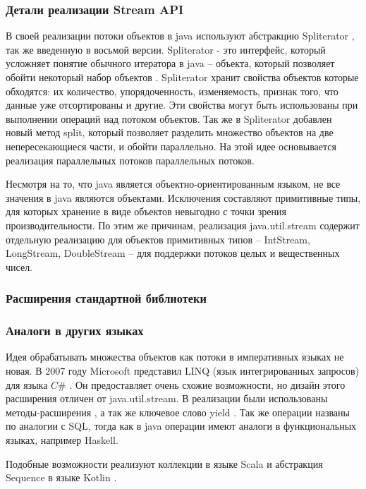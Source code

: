 \subsubsection{Детали реализации Stream API}
В своей реализации потоки объектов в java используют абстракцию Spliterator 
\cite{java:spliterator}, так же введенную в восьмой версии. Spliterator - это интерфейс, 
который усложняет понятие обычного итератора в java -- объекта, который позволяет обойти 
некоторый набор объектов \cite{java:iterator}. Spliterator хранит свойства объектов которые 
обходятся: их количество, упорядоченность, изменяемость, признак того, что данные уже 
отсортированы и другие. Эти свойства могут быть использованы при выполнении операций над 
потоком объектов. Так же в Spliterator добавлен новый метод split, который позволяет 
разделить множество объектов на две непересекающиеся части, и обойти параллельно. На этой идее основывается реализация параллельных потоков параллельных потоков.

Несмотря на то, что java является объектно-ориентированным языком, не все значения в java 
являются объектами. Исключения составляют примитивные типы, для которых хранение в виде 
объектов невыгодно с точки зрения производительности. По этим же причинам, реализация 
java.util.stream содержит отдельную реализацию для объектов примитивных типов -- IntStream, 
LongStream, DoubleStream -- для поддержки потоков целых и вещественных чисел. 

\subsubsection{Расширения стандартной библиотеки}


\subsubsection{Аналоги в других языках}
Идея обрабатывать множества объектов как потоки в императивных языках не новая. В 2007 году Microsoft представил LINQ (язык интегрированных запросов) для языка $C\#$ \cite{ms:linq}. Он предоставляет очень схожие возможности, но дизайн этого расширения отличен от java.util.stream. В реализации были использованы методы-расширения \cite{ms:ext}, а так же ключевое слово yield \cite{ms;yield}. Так же операции названы по аналогии с SQL, тогда как в java операции имеют аналоги в функциональных языках, например Haskell.

Подобные возможности реализуют коллекции в языке Scala \cite{ho:scala} и абстракция Sequence в языке Kotlin \cite{ho:kotlin}.
